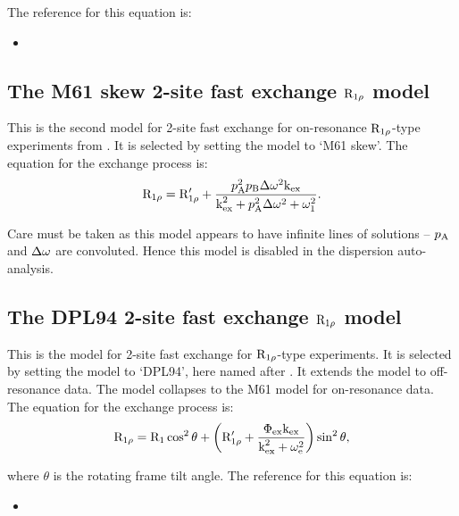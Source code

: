 The reference for this equation is:
\begin{itemize}
\item {}
\end{itemize}



\subsection{The M61 skew 2-site fast exchange $\mathrm{R}_{1\rho}$ model}
\label{sect: dispersion: M61 skew model}

This is the second model for 2-site fast exchange for on-resonance $\mathrm{R}_{1\rho}$-type experiments from \citet{Meiboom61}.  It is selected by setting the model to `M61 skew'.  The equation for the exchange process is:
\begin{equation}
    \mathrm{R}_{1\rho} = \mathrm{R}_{1\rho}' + \frac{p_\textrm{A}^2p_\textrm{B}\Delta\omega^2\textrm{k}_\textrm{ex}}{\textrm{k}_\textrm{ex}^2 + p_\textrm{A}^2\Delta\omega^2 + \omega_1^2} .
\end{equation}

Care must be taken as this model appears to have infinite lines of solutions -- $p_\textrm{A}$ and $\Delta\omega$ are convoluted.  Hence this model is disabled in the dispersion auto-analysis.



\subsection{The DPL94 2-site fast exchange $\mathrm{R}_{1\rho}$ model}
\label{sect: dispersion: DPL94 model}

This is the model for 2-site fast exchange for $\mathrm{R}_{1\rho}$-type experiments.  It is selected by setting the model to `DPL94', here named after \citet{Davis94}.  It extends the \citet{Meiboom61} model to off-resonance data.  The model collapses to the M61 model for on-resonance data.  The equation for the exchange process is:
\begin{equation}
    \mathrm{R}_{1\rho} = \mathrm{R}_1 \cos^2\theta  +  \left( \mathrm{R}_{1\rho}' + \frac{\Phi_\textrm{ex}\textrm{k}_\textrm{ex}}{\textrm{k}_\textrm{ex}^2 + \omega_\textrm{e}^2} \right) \sin^2\theta ,
\end{equation}

where $\theta$ is the rotating frame tilt angle.  The reference for this equation is:
\begin{itemize}
\item {}
\end{itemize}


